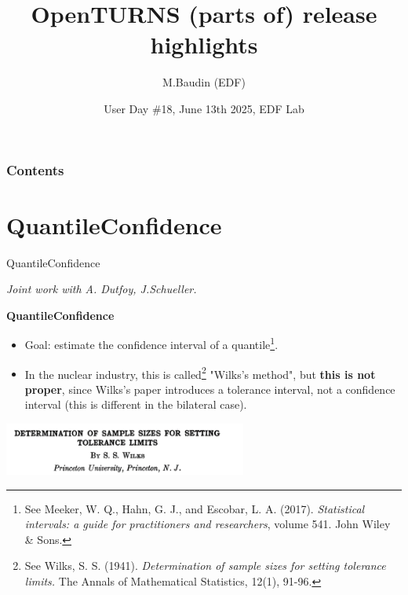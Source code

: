 \documentclass[aspectratio=169]{beamer}
\title[OpenTURNS]{OpenTURNS (parts of) release highlights}
\author[OpenTURNS et al.]{M.Baudin (EDF)}
\date[]{User Day \#18, June 13th 2025, EDF Lab}
\begin{document}

\begin{frame}
\titlepage

\end{frame}


\begin{frame}
\frametitle{Contents}
\tableofcontents
\end{frame}


\section{QuantileConfidence}

\begin{frame}{QuantileConfidence}

  \emph{Joint work with A. Dutfoy, J.Schueller.}

  \textbf{QuantileConfidence}
  \begin{itemize}
  \item Goal: estimate the confidence interval of a 
  quantile\footnote{See Meeker, W. Q., Hahn, G. J., and Escobar, L. A. (2017). \emph{Statistical intervals: a guide for practitioners and researchers}, volume 541. John Wiley \& Sons.}.
  \item In the nuclear industry, this is called\footnote{See Wilks, S. S. (1941). \emph{Determination of sample sizes for setting tolerance limits.} The Annals of Mathematical Statistics, 12(1), 91-96.} 
  "Wilks's method", but \textbf{this is not proper}, since Wilks's paper 
  introduces a tolerance interval, not a confidence 
  interval (this is different in the bilateral case).
  \end{itemize}

  \begin{center}
    \includegraphics[width=0.6\textwidth]{figures/Wilks_determination_tolerance_limits.png}
  \end{center}
  
\end{frame}
\end{document}
